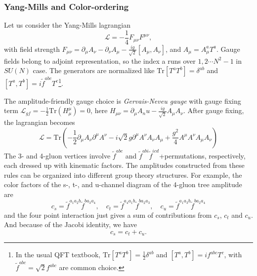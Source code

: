 \documentclass[12pt]{article}
\numberwithin{equation}{section}
\begin{document}
\subsubsection{Yang-Mills and Color-ordering}
Let us consider the Yang-Mills lagrangian
\begin{equation}
    \mathcal{L}=-\frac{1}{4}F_{\mu\nu}F^{\mu\nu},
\end{equation}
with field strength $F_{\mu\nu}=\partial_\mu A_\nu -  \partial_\nu A_\mu - \frac{ig}{\sqrt{2}}[A_\mu,A_\nu]$, and $A_\mu=A_\mu^a T^a$. Gauge fields belong to adjoint representation, so the index a runs over $1,2 \cdots N^2-1$ in $SU(N)$ case. The generators are normalized like $\textrm{Tr}[T^aT^b]=\delta^{ab}$ and $[T^a,T^b]=i\tilde{f}^{abc}T^c$\footnote{In the usual QFT textbook,
$\textrm{Tr}[T^aT^b]=\frac{1}{2}\delta^{ab}$ and $[T^a,T^b]=if^{abc}T^c$, with $\tilde{f}^{abc}=\sqrt{2}f^{abc}$ are common choice.  }. 

The amplitude-friendly gauge choice is \textit{Gervais-Neveu gauge } with gauge fixing term $\mathcal{L}_{gf}=-\frac{1}{2}\mathrm{Tr}(H_\mu^\mu)=0$, here $H_{\mu\nu}=\partial_\mu A_nu - \frac{ig}{\sqrt{2}}A_\mu A_\nu$.
After gauge fixing, the lagrangian becomes 
\begin{equation}
    \mathcal{L}=\mathrm{Tr} \left(-\frac{1}{2}\partial_\mu A_\nu \partial^\mu A^\nu - i\sqrt{2}g\partial^\mu A^\nu A_\nu A_\mu+\frac{g^2}{4}A^\mu A^\nu A_\mu A_\nu \right)
\end{equation}
The 3- and 4-gluon vertices involve $\tilde{f}^{abc}$ and $\tilde{f}^{abi}\tilde{f}^{icd}$+permutations, respectively, each dressed up with kinematic factors.
The amplitudes constructed from these rules can be organized into
different group theory structures. For example, the
color factors of the s-, t-, and u-channel diagram of the 4-gluon tree amplitude are
\begin{equation}
    c_s=\tilde{f}^{a_1a_2b}\tilde{f}^{ba_3a_4},\quad c_t=\tilde{f}^{a_4a_1b}\tilde{f}^{ba_2a_3},\quad c_u=\tilde{f}^{a_1a_3b}\tilde{f}^{ba_2a_4}
\end{equation}
and the four point interaction just gives a sum of contributions from $c_s$, $c_t$ and $c_u$. And because of the Jacobi identity, we have
\begin{equation}
    c_s=c_t+c_u.
\end{equation}
\end{document}
